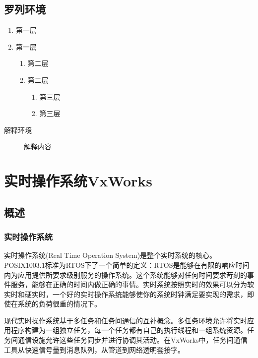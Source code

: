 \documentclass[format=draft,language=chinese,degree=master]{hustthesis}
\begin{document}
\section{罗列环境}

\begin{enumerate}
    \item 第一层\label{item:1}
    \item 第一层
    \begin{enumerate}
        \item 第二层\label{item:2}
        \item 第二层
        \begin{enumerate}
            \item 第三层\label{item:3}
            \item 第三层
        \end{enumerate}
    \end{enumerate}
\end{enumerate}

\begin{description}
    \item[解释环境]  解释内容
\end{description}



\clearpage
\chapter{实时操作系统VxWorks}
\section{概述}
\subsection{实时操作系统}
实时操作系统(Real Time Operation System)是整个实时系统的核心。POSIX1003.1标准为RTOS下了一个简单的定义：RTOS是能够在有限的响应时间内为应用提供所要求级别服务的操作系统\cite{Renard20081003}。这个系统能够对任何时间要求苛刻的事件服务，能够在正确的时间内做正确的事情。实时系统按照实时的效果可以分为软实时和硬实时，一个好的实时操作系统能够使你的系统时钟满足要实现的需求，即使在系统的负荷很重的情况下。

现代实时操作系统基于多任务和任务间通信的互补概念。多任务环境允许将实时应用程序构建为一组独立任务，每一个任务都有自己的执行线程和一组系统资源。任务间通信设施允许这些任务同步并进行协调其活动。在VxWorks中，任务间通信工具从快速信号量到消息队列，从管道到网络透明套接字。
\end{document}
